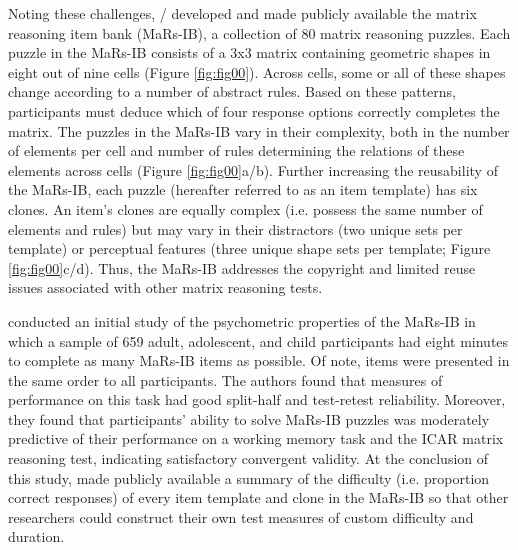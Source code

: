 \documentclass[a4paper,man,natbib]{apa6}
\begin{document}
Noting these challenges, \cite{knoll2016window} / \cite{chierchia2019matrix} developed and made publicly available the matrix reasoning item bank (MaRs-IB), a collection of 80 matrix reasoning puzzles. Each puzzle in the MaRs-IB consists of a 3x3 matrix containing geometric shapes in eight out of nine cells (Figure \ref{fig:fig00}). Across cells, some or all of these shapes change according to a number of abstract rules. Based on these patterns, participants must deduce which of four response options correctly completes the matrix. The puzzles in the MaRs-IB vary in their complexity, both in the number of elements per cell and number of rules determining the relations of these elements across cells (Figure \ref{fig:fig00}a/b). Further increasing the reusability of the MaRs-IB, each puzzle (hereafter referred to as an item template) has six clones. An item's clones are equally complex (i.e. possess the same number of elements and rules) but may vary in their distractors (two unique sets per template) or perceptual features (three unique shape sets per template; Figure \ref{fig:fig00}c/d). Thus, the MaRs-IB addresses the copyright and limited reuse issues associated with other matrix reasoning tests.   

\cite{chierchia2019matrix} conducted an initial study of the psychometric properties of the MaRs-IB in which a sample of 659 adult, adolescent, and child participants had eight minutes to complete as many MaRs-IB items as possible. Of note, items were presented in the same order to all participants. The authors found that measures of performance on this task had good split-half and test-retest reliability. Moreover, they found that participants' ability to solve MaRs-IB puzzles was moderately predictive of their performance on a working memory task and the ICAR matrix reasoning test, indicating satisfactory convergent validity. At the conclusion of this study, \cite{chierchia2019matrix} made publicly available a summary of the difficulty (i.e. proportion correct responses) of every item template and clone in the MaRs-IB so that other researchers could construct their own test measures of custom difficulty and duration.
\end{document}
